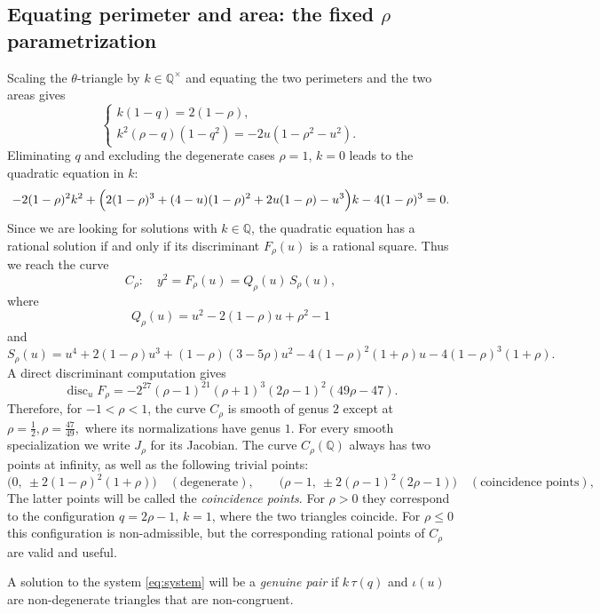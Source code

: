 \documentclass[11pt]{amsart}
\theoremstyle{plain}
\theoremstyle{remark}
\theoremstyle{plain}
\newcommand{\Q}{\mathbb{Q}}
\begin{document}
\subsection{Equating perimeter and area: the fixed $\rho$ parametrization}
Scaling the $\theta$-triangle by $k\in\Q^{\times}$ and equating the two
perimeters and the two areas gives
\begin{equation}\label{eq:system}
  \begin{cases}
    k(1-q)=2(1-\rho),\\[2pt]
    k^{2}(\rho-q)(1-q^{2})=-2u(1-\rho^{2}-u^{2}).
  \end{cases}
\end{equation}
Eliminating $q$ and excluding the degenerate cases $\rho=1$, $k=0$ leads to the quadratic equation in $k$:
 \[
-2(1-\rho)^2k^2
+\Bigl(
2(1-\rho)^3
+(4-u)(1-\rho)^2
+2u(1-\rho)
-u^3
\Bigr)k
-4(1-\rho)^3
=0.
\]
Since we are looking for solutions with $k\in\Q$, the quadratic equation has a rational solution if and only if its discriminant $F_\rho(u)$ is a rational square.
Thus we reach the curve
\begin{equation}\label{eq:Crho}
  C_{\rho}\colon\quad y^{2}=F_{\rho}(u)=Q_{\rho}(u)\,S_{\rho}(u),
\end{equation}
where
\[
  Q_{\rho}(u)=u^{2}-2(1-\rho)u+\rho^{2}-1
\]
and
\[
  S_{\rho}(u)=u^{4}+2(1-\rho)u^{3}+(1-\rho)(3-5\rho)u^{2}
  -4(1-\rho)^{2}(1+\rho)u-4(1-\rho)^{3}(1+\rho).
\]
A direct discriminant computation gives
\[
 \operatorname{disc}_{u}F_{\rho}
 =-2^{27}(\rho-1)^{21}(\rho+1)^3(2\rho-1)^2(49\rho-47).
\]
Therefore,  for $-1<\rho<1$, the curve $C_{\rho}$ is smooth of genus $2$
except at $
  \rho=\frac12, \rho=\frac{47}{49},$
where its normalizations have genus $1$.  For every smooth specialization we write
$J_{\rho}$ for its Jacobian.
The curve $C_\rho(\Q)$ always has two points at infinity, as well as the
 following trivial points:
\[
  \bigl(0,\ \pm 2(1-\rho)^{2}(1+\rho)\bigr)\quad(\text{degenerate}),
  \qquad
  \bigl(\rho-1,\ \pm 2(\rho-1)^{2}(2\rho-1)\bigr)\quad(\text{coincidence points}),
\]The latter points will be called the \emph{coincidence points}. For
$\rho>0$ they correspond to the configuration
$q=2\rho-1$, $k=1$, where the two triangles coincide. For $\rho\leq0$ this configuration is
non-admissible, but the corresponding rational points of $C_\rho$
are valid and useful.


A solution to the system \eqref{eq:system} will be a  \emph{genuine pair} if $k\,\tau(q)$ and $\iota(u)$ are  non-degenerate
triangles  that
are non-congruent.
\end{document}
